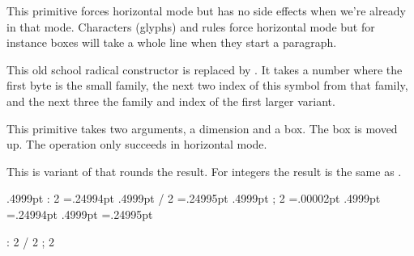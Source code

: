 \stopnewprimitive

\startnewprimitive[title={\prm {quitvmode}}]

This primitive forces horizontal mode but has no side effects when we're already
in that mode. Characters (glyphs) and rules force horizontal mode but for
instance boxes will take a whole line when they start a paragraph.

\stopnewprimitive

\startoldprimitive[title={\prm {radical}}][obsolete=yes]

This old school radical constructor is replaced by . It takes a
number where the first byte is the small family, the next two index of this
symbol from that family, and the next three the family and index of the first
larger variant.

\stopoldprimitive

\startoldprimitive[title={\prm {raise}}]

This primitive takes two arguments, a dimension and a box. The box is moved up.
The operation only succeeds in horizontal mode.

\stopoldprimitive

\startnewprimitive[title={\prm {rdivide}}]

This is variant of  that rounds the result. For integers the result
is the same as .

\startbuffer
\the\dimexpr .4999pt                     : 2 \relax            =.24994pt
\the\dimexpr .4999pt                     / 2 \relax            =.24995pt
\the\dimexpr .4999pt                     ; 2 \relax            =.00002pt
\scratchdimen.4999pt \divide {} \the\scratchdimen =.24994pt
\scratchdimen.4999pt \edivide{} \the\scratchdimen =.24995pt
\scratchdimen 4999pt \rdivide{} \the\scratchdimen =2500.0pt
\scratchdimen 5000pt \rdivide{} \the\scratchdimen =2500.0pt

\the{}                       : 2 
\the{}                       / 2 
\the{}                       ; 2 
 \divide {} \the{}
 \edivide{} \the{}
 \rdivide{} \the{}
\stopbuffer

\typebuffer

\startlines
\getbuffer
\stoplines

